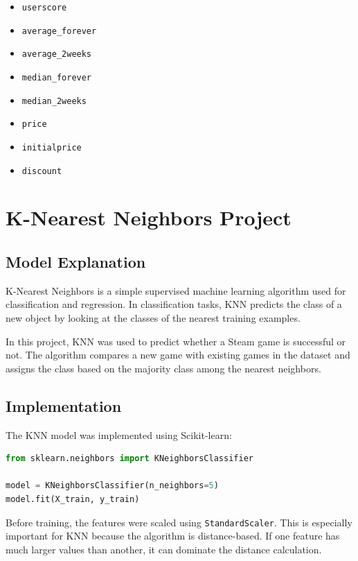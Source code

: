 \documentclass[12pt,a4paper]{article}
\begin{document}
\begin{itemize}
    \item \texttt{userscore}
    \item \texttt{average\_forever}
    \item \texttt{average\_2weeks}
    \item \texttt{median\_forever}
    \item \texttt{median\_2weeks}
    \item \texttt{price}
    \item \texttt{initialprice}
    \item \texttt{discount}
\end{itemize}

\section{K-Nearest Neighbors Project}

\subsection{Model Explanation}

K-Nearest Neighbors is a simple supervised machine learning algorithm used for classification and regression. In classification tasks, KNN predicts the class of a new object by looking at the classes of the nearest training examples.

In this project, KNN was used to predict whether a Steam game is successful or not. The algorithm compares a new game with existing games in the dataset and assigns the class based on the majority class among the nearest neighbors.

\subsection{Implementation}

The KNN model was implemented using Scikit-learn:

\begin{lstlisting}[language=Python]
from sklearn.neighbors import KNeighborsClassifier

model = KNeighborsClassifier(n_neighbors=5)
model.fit(X_train, y_train)
\end{lstlisting}

Before training, the features were scaled using \texttt{StandardScaler}. This is especially important for KNN because the algorithm is distance-based. If one feature has much larger values than another, it can dominate the distance calculation.
\end{document}
